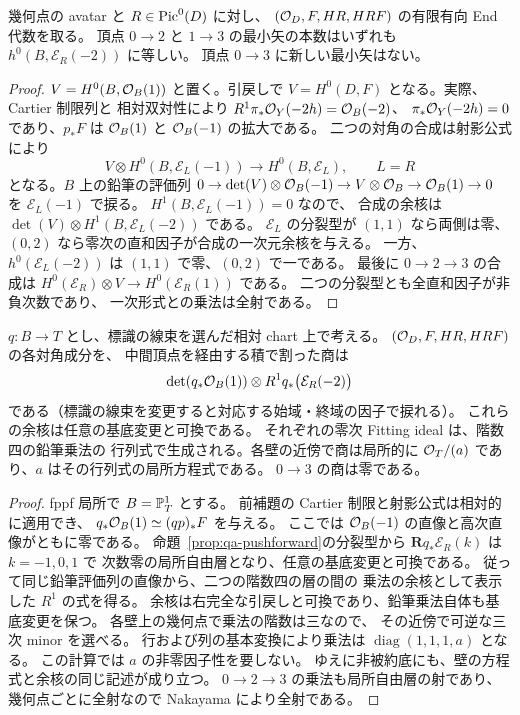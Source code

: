 \begin{lemma}[射影束の分裂型から有限窓の対角矢を数える]
\label{lem:qa-avatar-finite-diagonal-count}
幾何点の avatar と $R\in\operatorname{Pic}^0(D)$ に対し、
$(\mathcal O_D,F,HR,HRF)$ の有限有向 End 代数を取る。
頂点 $0\to2$ と $1\to3$ の最小矢の本数はいずれも
$h^0(B,\mathcal E_R(-2))$ に等しい。
頂点 $0\to3$ に新しい最小矢はない。
\end{lemma}
\begin{proof}
$V=H^0(B,\mathcal O_B(1))$ と置く。引戻しで
$V=H^0(D,F)$ となる。実際、Cartier 制限列と
相対双対性により $R^1\pi_*\mathcal O_Y(-2h)=\mathcal O_B(-2)$、
$\pi_*\mathcal O_Y(-2h)=0$ であり、$p_*F$ は
$\mathcal O_B(1)$ と $\mathcal O_B(-1)$ の拡大である。
二つの対角の合成は射影公式により
\[
 V\otimes H^0(B,\mathcal E_L(-1))
     \longrightarrow H^0(B,\mathcal E_L),
 \qquad L=R
\]
となる。$B$ 上の鉛筆の評価列
$0\to\det(V)\otimes\mathcal O_B(-1)\to V\otimes\mathcal O_B
\to\mathcal O_B(1)\to0$ を $\mathcal E_L(-1)$ で捩る。
$H^1(B,\mathcal E_L(-1))=0$ なので、
合成の余核は $\det(V)\otimes H^1(B,\mathcal E_L(-2))$ である。
$\mathcal E_L$ の分裂型が $(1,1)$ なら両側は零、
$(0,2)$ なら零次の直和因子が合成の一次元余核を与える。
一方、$h^0(\mathcal E_L(-2))$ は $(1,1)$ で零、$(0,2)$ で一である。
最後に $0\to2\to3$ の合成は
$H^0(\mathcal E_R)\otimes V\to H^0(\mathcal E_R(1))$ である。
二つの分裂型とも全直和因子が非負次数であり、
一次形式との乗法は全射である。
\end{proof}

\begin{proposition}[有限窓の対角余核と相対分裂壁]
\label{prop:qa-avatar-relative-diagonal-wall}
$q:B\to T$ とし、標識の線束を選んだ相対 chart 上で考える。
$(\mathcal O_D,F,HR,HRF)$ の各対角成分を、
中間頂点を経由する積で割った商は
\[
 \det(q_*\mathcal O_B(1))\otimes R^1q_*\bigl(\mathcal E_R(-2)\bigr)
\]
である（標識の線束を変更すると対応する始域・終域の因子で捩れる）。
これらの余核は任意の基底変更と可換である。
それぞれの零次 Fitting ideal は、階数四の鉛筆乗法の
行列式で生成される。各壁の近傍で商は局所的に
$\mathcal O_T/(a)$ であり、$a$ はその行列式の局所方程式である。
$0\to3$ の商は零である。
\end{proposition}
\begin{proof}
fppf 局所で $B=\mathbb P^1_T$ とする。
前補題の Cartier 制限と射影公式は相対的に適用でき、
$q_*\mathcal O_B(1)\simeq(qp)_*F$ を与える。
ここでは $\mathcal O_B(-1)$ の直像と高次直像がともに零である。
命題~\ref{prop:qa-pushforward}の分裂型から
$\mathbf Rq_*\mathcal E_R(k)$ は $k=-1,0,1$ で
次数零の局所自由層となり、任意の基底変更と可換である。
従って同じ鉛筆評価列の直像から、二つの階数四の層の間の
乗法の余核として表示した $R^1$ の式を得る。
余核は右完全な引戻しと可換であり、鉛筆乗法自体も基底変更を保つ。
各壁上の幾何点で乗法の階数は三なので、
その近傍で可逆な三次 minor を選べる。
行および列の基本変換により乗法は
$\operatorname{diag}(1,1,1,a)$ となる。
この計算では $a$ の非零因子性を要しない。
ゆえに非被約底にも、壁の方程式と余核の同じ記述が成り立つ。
$0\to2\to3$ の乗法も局所自由層の射であり、
幾何点ごとに全射なので Nakayama により全射である。
\end{proof}

